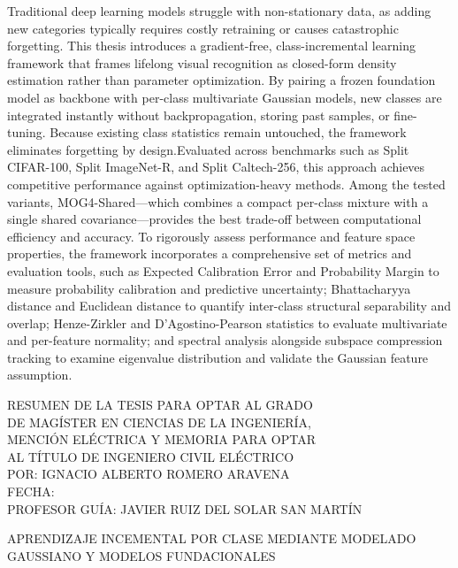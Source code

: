 \noindent Traditional deep learning models struggle with non-stationary data, as adding new categories typically requires costly retraining or causes catastrophic forgetting. This thesis introduces a gradient-free, class-incremental learning framework that frames lifelong visual recognition as closed-form density estimation rather than parameter optimization. By pairing a frozen foundation model as backbone with per-class multivariate Gaussian models, new classes are integrated instantly without backpropagation, storing past samples, or fine-tuning. Because existing class statistics remain untouched, the framework eliminates forgetting by design.Evaluated across benchmarks such as Split CIFAR-100, Split ImageNet-R, and Split Caltech-256, this approach achieves competitive performance against optimization-heavy methods. Among the tested variants, MOG4-Shared—which combines a compact per-class mixture with a single shared covariance—provides the best trade-off between computational efficiency and accuracy. To rigorously assess performance and feature space properties, the framework incorporates a comprehensive set of metrics and evaluation tools, such as Expected Calibration Error and Probability Margin to measure probability calibration and predictive uncertainty; Bhattacharyya distance and Euclidean distance to quantify inter-class structural separability and overlap; Henze-Zirkler and D'Agostino-Pearson statistics to evaluate multivariate and per-feature normality; and spectral analysis alongside subspace compression tracking to examine eigenvalue distribution and validate the Gaussian feature assumption.

 
 \newpage
 
\noindent\hfill
\begin{minipage}[t]{0.7\textwidth}
	RESUMEN DE LA TESIS PARA OPTAR AL GRADO \\ DE MAGÍSTER
	EN CIENCIAS DE LA INGENIERÍA, \\ MENCIÓN  ELÉCTRICA
    Y MEMORIA PARA OPTAR \\ AL TÍTULO DE 
	INGENIERO CIVIL ELÉCTRICO \\
	POR: IGNACIO ALBERTO ROMERO ARAVENA \\
	FECHA: \the\year \\
	PROFESOR GUÍA: JAVIER RUIZ DEL SOLAR SAN MARTÍN
\end{minipage}

 
 \begin{center}
 	APRENDIZAJE INCEMENTAL POR CLASE MEDIANTE MODELADO GAUSSIANO Y MODELOS FUNDACIONALES
 \end{center}
 
